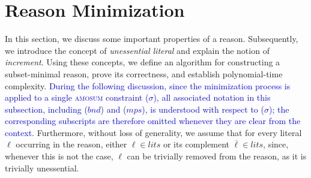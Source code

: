 \documentclass[preprint,authoryear]{elsarticle}
\newcommand{\lits}{\mathit{lits}}
\newcommand{\mps}{\mathit{mps}}
\newcommand{\bnd}{\mathit{bnd}}
\theoremstyle{definition}
\begin{document}
\section{Reason Minimization}
\label{sec:minimization}
In this section, we  discuss some important properties of a reason. Subsequently, we introduce the concept of \textit{unessential literal} and explain the notion of \textit{increment}.
Using these concepts, we define an algorithm for constructing a subset-minimal reason, prove its correctness, and establish polynomial-time complexity.
\textcolor{blue}{During the following discussion, since the minimization process is applied to a single \textsc{amosum} constraint ($\sigma$), all associated notation in this subsection, including ($\bnd$) and ($\mps$), is understood with respect to ($\sigma$); the corresponding subscripts are therefore omitted whenever they are clear from the context. }
Furthermore, without loss of generality, we assume that for every literal $\ell$ occurring in the reason, either $\ell \in \lits$ or its complement $\overline{\ell} \in \lits$, since, whenever this is not the case, $\ell$ can be trivially removed from the reason, as it is trivially unessential.
\end{document}
